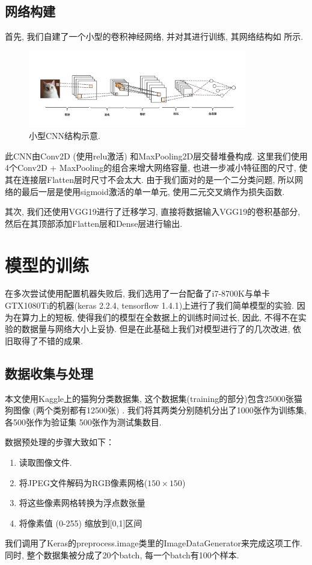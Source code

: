 \documentclass[lang=cn,11pt]{elegantpaper}
\begin{document}
\subsection{网络构建}

首先, 我们自建了一个小型的卷积神经网络, 并对其进行训练, 其网络结构如  所示. 
\begin{figure}[htbp]
	\centering
	  \includegraphics[width=0.85\textwidth]{cnn1.png}
	  \tiny
	  \caption{小型CNN结构示意.\label{fig:cnn1}}
\end{figure}

\normalsize
此CNN由Conv2D (使用relu激活) 和MaxPooling2D层交替堆叠构成. 这里我们使用4个Conv2D + MaxPooling的组合来增大网络容量, 也进一步减小特征图的尺寸, 使其在连接层Flatten层时尺寸不会太大. 由于我们面对的是一个二分类问题, 所以网络的最后一层是使用sigmoid激活的单一单元, 使用二元交叉熵作为损失函数. 

其次, 我们还使用VGG19进行了迁移学习, 直接将数据输入VGG19的卷积基部分, 然后在其顶部添加Flatten层和Dense层进行输出. 

\section{模型的训练}

在多次尝试使用配置机器失败后, 我们选用了一台配备了i7-8700K与单卡GTX1080Ti的机器(keras 2.2.4, tensorflow 1.4.1)上进行了我们简单模型的实验. 因为在算力上的短板, 使得我们的模型在全数据上的训练时间过长, 因此, 不得不在实验的数据量与网络大小上妥协. 但是在此基础上我们对模型进行了的几次改进, 依旧取得了不错的成果. 

\subsection{数据收集与处理}
本文使用Kaggle上的猫狗分类数据集, 这个数据集(training的部分)包含25000张猫狗图像 (两个类别都有12500张) . 我们将其两类分别随机分出了1000张作为训练集, 各500张作为验证集 500张作为测试集数目.

  数据预处理的步骤大致如下：

\begin{enumerate}
	\item 读取图像文件.
	\item 将JPEG文件解码为RGB像素网格($150\times 150$)
	\item 将这些像素网格转换为浮点数张量
	\item 将像素值 (0-255) 缩放到[0,1]区间
\end{enumerate}
我们调用了Keras的preprocess.image类里的ImageDataGenerator来完成这项工作. 同时, 整个数据集被分成了20个batch, 每一个batch有100个样本. 
\end{document}
